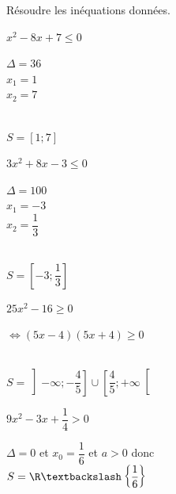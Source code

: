 \documentclass[12pt,a4paper]{article}  %
\begin{document}
Résoudre les inéquations données.
\begin{enumMet}
    \item {} $x^{2}-8 x+7 \leqslant 0$\\
    \begin{corrBox}
        $\Delta=36$\\
        $x_1=1$\\
        $x_2=7$\\
        \\
        $S=\left[1;7\right]$
    \end{corrBox}
    \item $3 x^{2}+8 x-3 \leqslant 0$\\
    \begin{corrBox}
        $\Delta=100$\\
        $x_1=-3$\\
        $x_2=\dfrac{1}{3}$\\
        \\
        $S=\left[-3;\dfrac{1}{3}\right]$
    \end{corrBox}
    \item $25 x^{2}-16 \geqslant 0$\\
    \begin{corrBox}
        $\iff (5x-4)(5x+4) \geqslant 0$\\
        \\
        $S=\left]-\infty;-\dfrac{4}{5}\right]\cup\left[\dfrac{4}{5}; +\infty\right[$
    \end{corrBox}
    \item $9 x^{2}-3x+\dfrac{1}{4}>0$\\
    \begin{corrBox}
        $\Delta=0$ et $x_0=\dfrac{1}{6}$ et $a>0$ donc\\ $S=\R\textbackslash\left\{\dfrac{1}{6}\right\}$
    \end{corrBox}
\end{enumMet}
\end{document}
